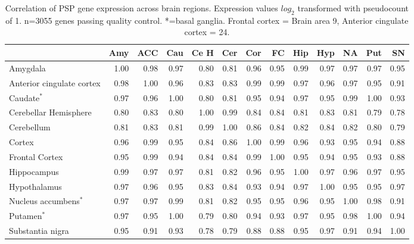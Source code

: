 \begin{table}[ht]
\centering
\begin{adjustbox}{width=\textwidth}

\begin{tabular}{lrrrrrrrrrrrr}
  \hline
 &   Amy &   ACC &   Cau &   Ce H &   Cer &   Cor &   FC  &   Hip &   Hyp &   NA &   Put &  SN \\ 
  \hline
  Amygdala & 1.00 & 0.98 & 0.97 & 0.80 & 0.81 & 0.96 & 0.95 & 0.99 & 0.97 & 0.97 & 0.97 & 0.95 \\ 
    Anterior cingulate cortex  & 0.98 & 1.00 & 0.96 & 0.83 & 0.83 & 0.99 & 0.99 & 0.97 & 0.96 & 0.97 & 0.95 & 0.91 \\ 
    Caudate$^*$ & 0.97 & 0.96 & 1.00 & 0.80 & 0.81 & 0.95 & 0.94 & 0.97 & 0.95 & 0.99 & 1.00 & 0.93 \\ 
    Cerebellar Hemisphere & 0.80 & 0.83 & 0.80 & 1.00 & 0.99 & 0.84 & 0.84 & 0.81 & 0.83 & 0.81 & 0.79 & 0.78 \\ 
    Cerebellum & 0.81 & 0.83 & 0.81 & 0.99 & 1.00 & 0.86 & 0.84 & 0.82 & 0.84 & 0.82 & 0.80 & 0.79 \\ 
    Cortex & 0.96 & 0.99 & 0.95 & 0.84 & 0.86 & 1.00 & 0.99 & 0.96 & 0.93 & 0.95 & 0.94 & 0.88 \\ 
    Frontal Cortex  & 0.95 & 0.99 & 0.94 & 0.84 & 0.84 & 0.99 & 1.00 & 0.95 & 0.94 & 0.95 & 0.93 & 0.88 \\ 
    Hippocampus & 0.99 & 0.97 & 0.97 & 0.81 & 0.82 & 0.96 & 0.95 & 1.00 & 0.97 & 0.96 & 0.97 & 0.95 \\ 
    Hypothalamus & 0.97 & 0.96 & 0.95 & 0.83 & 0.84 & 0.93 & 0.94 & 0.97 & 1.00 & 0.95 & 0.95 & 0.97 \\ 
    Nucleus accumbens$^*$ & 0.97 & 0.97 & 0.99 & 0.81 & 0.82 & 0.95 & 0.95 & 0.96 & 0.95 & 1.00 & 0.98 & 0.91 \\ 
    Putamen$^*$  & 0.97 & 0.95 & 1.00 & 0.79 & 0.80 & 0.94 & 0.93 & 0.97 & 0.95 & 0.98 & 1.00 & 0.94 \\ 
     Substantia nigra & 0.95 & 0.91 & 0.93 & 0.78 & 0.79 & 0.88 & 0.88 & 0.95 & 0.97 & 0.91 & 0.94 & 1.00 \\ 
   \hline
\end{tabular}
\end{adjustbox}
\caption[Correlation of PSP gene expression across brain regions]{Correlation of PSP gene expression across brain regions. Expression values $log_2$ transformed with pseudocount of 1. n=3055 genes passing quality control. *=basal ganglia. Frontal cortex = Brain area 9, Anterior cingulate cortex = 24.}
\label{tab:Correlation of PSP gene expression across brain regions. Expression values $log_2$ transformed with pseudocount of 1}
\end{table}




